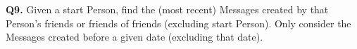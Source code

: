 \textbf{Q9.}
Given a start Person, find the (most recent) Messages created by that
Person's friends or friends of friends (excluding start Person). Only
consider the Messages created before a given date (excluding that date).
